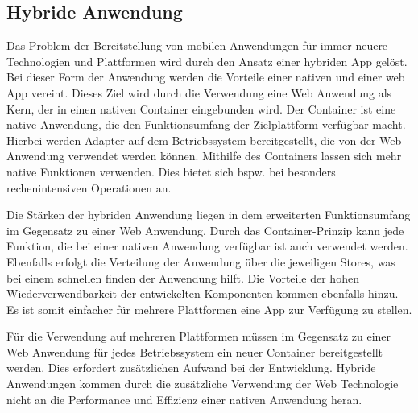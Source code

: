 \subsection{Hybride Anwendung} \label{hybridApplication}
Das Problem der Bereitstellung von mobilen Anwendungen für immer neuere Technologien und Plattformen wird durch den Ansatz einer hybriden App gelöst. Bei dieser Form der Anwendung werden die Vorteile einer nativen und einer web App vereint.  Dieses Ziel wird durch die Verwendung eine Web Anwendung als Kern, der in einen nativen Container eingebunden wird. Der Container ist eine native Anwendung, die den Funktionsumfang der Zielplattform verfügbar macht. Hierbei werden Adapter auf dem Betriebssystem bereitgestellt, die von der Web Anwendung verwendet werden können. Mithilfe des Containers lassen sich mehr native Funktionen verwenden. Dies bietet sich bspw. bei besonders rechenintensiven Operationen an.\par

Die Stärken der hybriden Anwendung liegen in dem erweiterten Funktionsumfang im Gegensatz zu einer Web Anwendung. Durch das Container-Prinzip kann jede Funktion, die bei einer nativen Anwendung verfügbar ist auch verwendet werden. Ebenfalls erfolgt die Verteilung der Anwendung über die jeweiligen Stores, was bei einem schnellen finden der Anwendung hilft. Die Vorteile der hohen Wiederverwendbarkeit der entwickelten Komponenten kommen ebenfalls hinzu. Es ist somit einfacher für mehrere Plattformen eine App zur Verfügung zu stellen. \par

Für die Verwendung auf mehreren Plattformen müssen im Gegensatz zu einer Web Anwendung für jedes Betriebssystem ein neuer Container bereitgestellt werden. Dies erfordert zusätzlichen Aufwand bei der Entwicklung. Hybride Anwendungen kommen durch die zusätzliche Verwendung der Web Technologie nicht an die Performance und Effizienz einer nativen Anwendung heran. 

